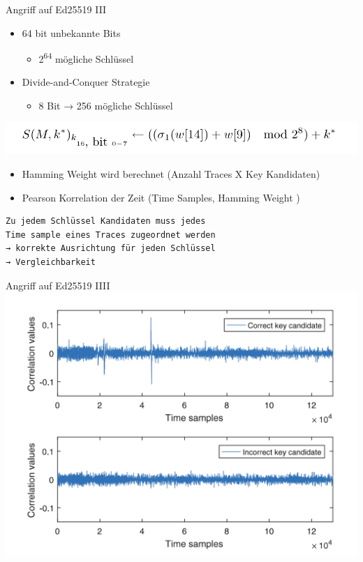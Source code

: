 \documentclass[
  9pt,
  ignorenonframetext,
  aspectratio=169,
]{beamer}
\providecommand{\tightlist}{%
  \setlength{\itemsep}{0pt}\setlength{\parskip}{0pt}}
\begin{document}
\begin{frame}[fragile]{Angriff auf Ed25519 III}
\protect\hypertarget{angriff-auf-ed25519-iii}{}
\begin{itemize}
\tightlist
\item
  64 bit unbekannte Bits

  \begin{itemize}
  \tightlist
  \item
    2\textsuperscript{64} mögliche Schlüssel
  \end{itemize}
\item
  Divide-and-Conquer Strategie

  \begin{itemize}
  \tightlist
  \item
    8 Bit → 256 mögliche Schlüssel
  \end{itemize}
\end{itemize}

\includegraphics[width=\textwidth,height=0.6\textheight]{Abbildungen/keyDPA.png}

\begin{itemize}
\tightlist
\item
  Hamming Weight wird berechnet (Anzahl Traces X Key Kandidaten)
\item
  Pearson Korrelation der Zeit (Time Samples, Hamming Weight )
\end{itemize}

\begin{verbatim}
Zu jedem Schlüssel Kandidaten muss jedes    
Time sample eines Traces zugeordnet werden    
→ korrekte Ausrichtung für jeden Schlüssel  
→ Vergleichbarkeit
\end{verbatim}
\end{frame}

\begin{frame}{Angriff auf Ed25519 IIII}
\protect\hypertarget{angriff-auf-ed25519-iiii}{}
\includegraphics{Abbildungen/cvDPA.png}
\end{frame}
\end{document}
